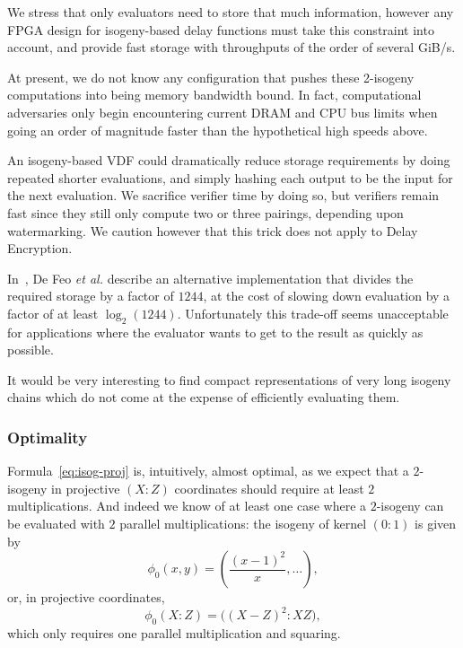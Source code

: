 \documentclass{llncs}
\begin{document}
We stress that only evaluators need to store that much information,
however any FPGA design for isogeny-based delay functions must take
this constraint into account, and provide fast storage with
throughputs of the order of several GiB/s. %

At present, we do not know any configuration that pushes these
2-isogeny computations into being memory bandwidth bound. 
In fact, computational adversaries only begin encountering current
DRAM and CPU bus limits when going an order of magnitude faster
than the hypothetical high speeds above.

An isogeny-based VDF could dramatically reduce storage requirements by
doing repeated shorter evaluations, and simply hashing each output
to be the input for the next evaluation.  We sacrifice verifier time
by doing so, but verifiers remain fast since they still only compute
two or three pairings, depending upon watermarking.  We caution however
that this trick does not apply to Delay Encryption. 

In~\cite{10.1007/978-3-030-34578-5_10}, De Feo \emph{et al.} describe
an alternative implementation that divides the required storage by a
factor of $1244$, at the cost of slowing down evaluation by a factor
of at least $\log_2(1244)$. %
Unfortunately this trade-off seems unacceptable for applications where
the evaluator wants to get to the result as quickly as possible. %

It would be very interesting to find compact representations of very
long isogeny chains which do not come at the expense of efficiently
evaluating them.

\subsubsection{Optimality}
Formula~\eqref{eq:isog-proj} is, intuitively, almost optimal, as we
expect that a $2$-isogeny in projective $(X:Z)$ coordinates should
require at least $2$ multiplications. %
And indeed we know of at least one case where a $2$-isogeny can be
evaluated with $2$ parallel multiplications: the isogeny of kernel
$(0:1)$ is given by
\begin{equation}
  \label{eq:isog-special}
  \phi_0(x,y) = \left(\frac{(x - 1)^2}{x}, \dots\right),
\end{equation}
or, in projective coordinates,
\begin{equation}
  \label{eq:isog-special-proj}
  \phi_0(X:Z) = \bigl((X - Z)^2:XZ\bigr),
\end{equation}
which only requires one parallel multiplication and squaring.
\end{document}
